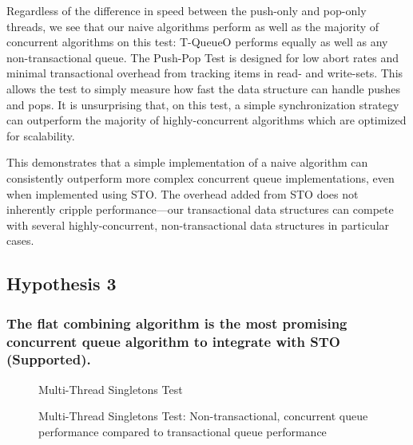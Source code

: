 Regardless of the difference in speed between the push-only and pop-only threads, we see that our naive algorithms perform as well as the majority of concurrent algorithms on this test: T-QueueO performs equally as well as any non-transactional queue. The Push-Pop Test is designed for low abort rates and minimal transactional overhead from tracking items in read- and write-sets. This allows the test to simply measure how fast the data structure can handle pushes and pops. It is unsurprising that, on this test, a simple synchronization strategy can outperform the majority of highly-concurrent algorithms which are optimized for scalability. 

This demonstrates that a simple implementation of a naive algorithm can consistently outperform more complex concurrent queue implementations, even when implemented using STO. The overhead added from STO does not inherently cripple performance---our transactional data structures can compete with several highly-concurrent, non-transactional data structures in particular cases. 

\vspace{12pt}
\noindent{}


\newpage
\subsection{Hypothesis 3}
\subsubsection{The flat combining algorithm is the most promising concurrent queue algorithm to integrate with STO (Supported).}
\label{eval:hypo3}

\begin{figure}[ht!]
    \centering
   	\begin{minipage}{0.75\textwidth}
        \caption*{Multi-Thread Singletons Test}
	\end{minipage}
    \caption{Multi-Thread Singletons Test: Non-transactional, concurrent queue performance compared to transactional queue performance}
    \label{fig:ntqs}
\end{figure}


